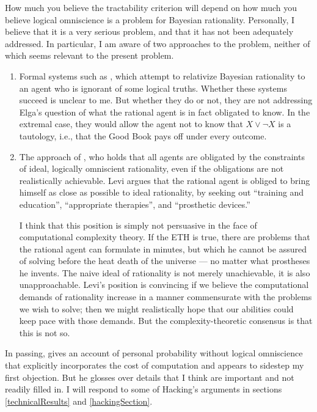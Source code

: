\documentclass[letterpaper,12pt]{article}
\begin{document}
How much you believe the tractability criterion will depend on how much you believe logical omniscience is a problem for Bayesian rationality. Personally, I believe that it is a very serious problem, and that it has not been adequately addressed. In particular, I am aware of two approaches to the problem, neither of which seems relevant to the present problem.
\begin{enumerate}
\item
Formal systems such as \cite{garber1983}, which attempt to relativize Bayesian rationality to an agent who is ignorant of some logical truths. Whether these systems succeed is unclear to me. But whether they do or not, they are not addressing Elga's question of what the rational agent is in fact obligated to know. In the extremal case, they would allow the agent not to know that $X \lor \neg X$ is a tautology, i.e., that the Good Book pays off under every outcome.
\item
The approach of \cite{DBLP:books/daglib/0022602}, who holds that all agents are obligated by the constraints of ideal, logically omniscient rationality, even if the obligations are not realistically achievable. Levi argues that the rational agent is obliged to bring himself as close as possible to ideal rationality, by seeking out ``training and education'', ``appropriate therapies'', and ``prosthetic devices.''

I think that this position is simply not persuasive in the face of computational complexity theory. If the ETH is true, there are problems that the rational agent can formulate in minutes, but which he cannot be assured of solving before the heat death of the universe --- no matter what prostheses he invents. The naive ideal of rationality is not merely unachievable, it is also unapproachable. Levi's position is convincing if we believe the computational demands of rationality increase in a manner commensurate with the problems we wish to solve; then we might realistically hope that our abilities could keep pace with those demands. But the complexity-theoretic consensus is that this is not so.
\end{enumerate}
In passing, \cite{hacking1967} gives an account of personal probability without logical omniscience that explicitly incorporates the cost of computation and appears to sidestep my first objection. But he glosses over details that I think are important and not readily filled in. I will respond to some of Hacking's arguments in sections \ref{technicalResults} and \ref{hackingSection}.
\end{document}
